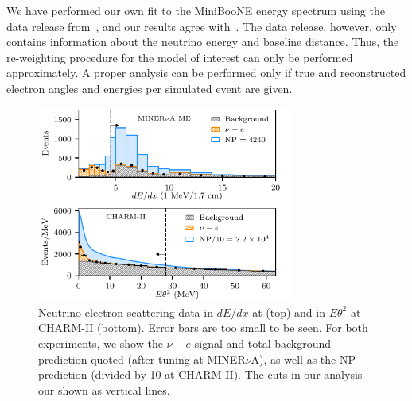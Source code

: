 We have performed our own fit to the MiniBooNE energy spectrum using the data release from~\cite{Aguilar-Arevalo:2018gpe}, and our results agree with~\cite{Bertuzzo:2018itn}. The data release, however, only contains information about the neutrino energy and baseline distance. Thus, the re-weighting procedure for the model of interest can only be performed approximately. A proper analysis can be performed only if true and reconstructed electron angles and energies per simulated event are given.  
%
\begin{figure}[h]
    \centering
    \includegraphics[width=0.75\textwidth]{both_cartoon.pdf}
    \caption[New physics signal in neutrino-electron scattering data.]{Neutrino-electron scattering data in $dE/dx$ at \minerva (top) and in $E\theta^2$ at CHARM-II (bottom). Error bars are too small to be seen. For both experiments, we show the $\nu-e$ signal and total background prediction quoted (after tuning at MINER$\nu$A), as well as the NP prediction (divided by 10 at CHARM-II). The cuts in our analysis our shown as vertical lines. \label{fig:NP_events}}
\end{figure}



